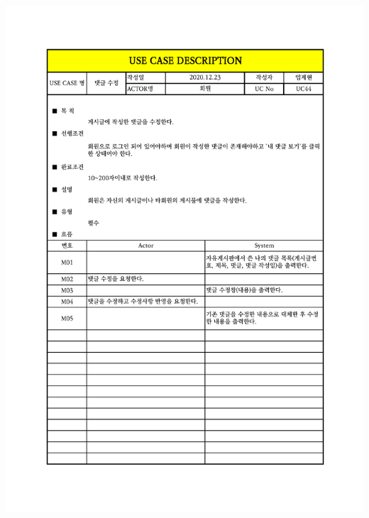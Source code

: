 {{{{{{{{{{{{{{{{{{{{{{{{{{{{{{{{{{{{{{{{{{{{{{{\includegraphics[width=1.1\textwidth]{./Figure/Design/Display/usecase/044.pdf} \\
}}}}}}}}}}}}}}}}}}}}}}}}}}}}}}}}}}}}}}}}}}}}}}}
